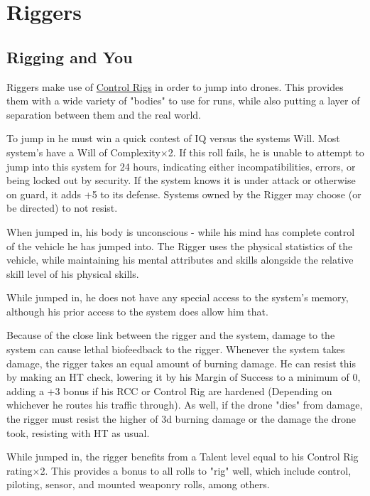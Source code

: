 \section{Riggers}\label{riggers}
\begin{multicols*}{3}
	
	\subsection{Rigging and You}\label{rigger_rules}
	
	Riggers make use of \hyperref[control_rig]{Control Rigs} in order to jump into drones. This provides them with a wide variety of "bodies" to use for runs, while also putting a layer of separation between them and the real world.
	
	To jump in he must win a quick contest of IQ versus the systems Will. Most system's have a Will of Complexity\(\times\)2. If this roll fails, he is unable to attempt to jump into this system for 24 hours, indicating either incompatibilities, errors, or being locked out by security. If the system knows it is under attack or otherwise on guard, it adds +5 to its defense. Systems owned by the Rigger may choose (or be directed) to not resist.
	
	When jumped in, his body is unconscious - while his mind has complete control of the vehicle he has jumped into. The Rigger uses the physical statistics of the vehicle, while maintaining his mental attributes and skills alongside the relative skill level of his physical skills.
	
	While jumped in, he does not have any special access to the system's memory, although his prior access to the system does allow him that.
	
	Because of the close link between the rigger and the system, damage to the system can cause lethal biofeedback to the rigger. Whenever the system takes damage, the rigger takes an equal amount of burning damage. He can resist this by making an HT check, lowering it by his Margin of Success to a minimum of 0, adding a +3 bonus if his RCC or Control Rig are hardened (Depending on whichever he routes his traffic through). As well, if the drone "dies" from damage, the rigger must resist the higher of 3d burning damage or the damage the drone took, resisting with HT as usual. 
	
	While jumped in, the rigger benefits from a Talent level equal to his Control Rig rating×2. This provides a bonus to all rolls to "rig" well, which include control, piloting, sensor, and mounted weaponry rolls, among others.
	

\end{multicols*}
